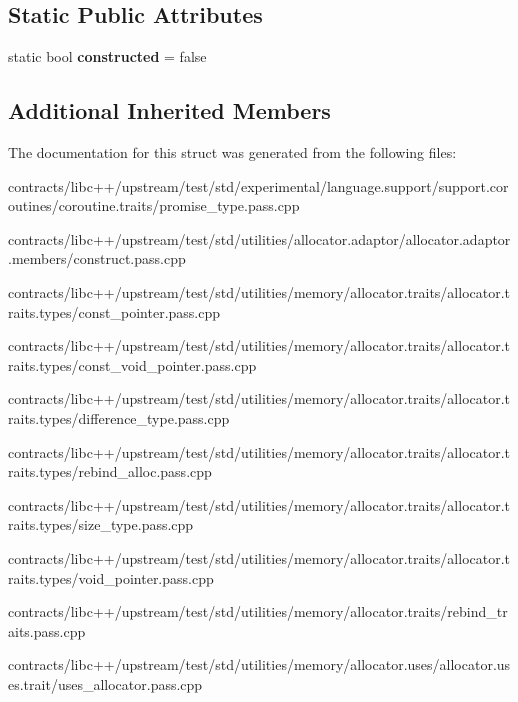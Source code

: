\subsection*{Static Public Attributes}
\begin{DoxyCompactItemize}
\item 
\mbox{\label{struct_d_a0caf5e88a68b173e93248bc9b2dffd4c}} 
static bool {\bfseries constructed} = false
\end{DoxyCompactItemize}
\subsection*{Additional Inherited Members}


The documentation for this struct was generated from the following files\+:\begin{DoxyCompactItemize}
\item 
contracts/libc++/upstream/test/std/experimental/language.\+support/support.\+coroutines/coroutine.\+traits/promise\+\_\+type.\+pass.\+cpp\item 
contracts/libc++/upstream/test/std/utilities/allocator.\+adaptor/allocator.\+adaptor.\+members/construct.\+pass.\+cpp\item 
contracts/libc++/upstream/test/std/utilities/memory/allocator.\+traits/allocator.\+traits.\+types/const\+\_\+pointer.\+pass.\+cpp\item 
contracts/libc++/upstream/test/std/utilities/memory/allocator.\+traits/allocator.\+traits.\+types/const\+\_\+void\+\_\+pointer.\+pass.\+cpp\item 
contracts/libc++/upstream/test/std/utilities/memory/allocator.\+traits/allocator.\+traits.\+types/difference\+\_\+type.\+pass.\+cpp\item 
contracts/libc++/upstream/test/std/utilities/memory/allocator.\+traits/allocator.\+traits.\+types/rebind\+\_\+alloc.\+pass.\+cpp\item 
contracts/libc++/upstream/test/std/utilities/memory/allocator.\+traits/allocator.\+traits.\+types/size\+\_\+type.\+pass.\+cpp\item 
contracts/libc++/upstream/test/std/utilities/memory/allocator.\+traits/allocator.\+traits.\+types/void\+\_\+pointer.\+pass.\+cpp\item 
contracts/libc++/upstream/test/std/utilities/memory/allocator.\+traits/rebind\+\_\+traits.\+pass.\+cpp\item 
contracts/libc++/upstream/test/std/utilities/memory/allocator.\+uses/allocator.\+uses.\+trait/uses\+\_\+allocator.\+pass.\+cpp\item 

\end{DoxyCompactItemize}
